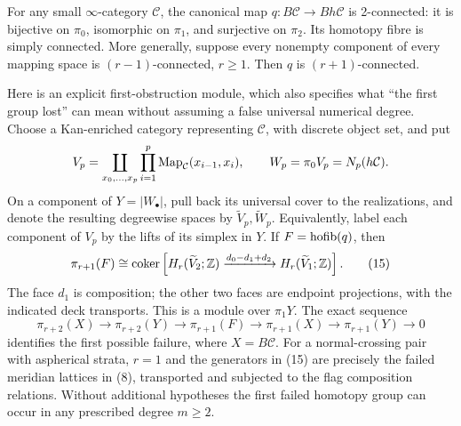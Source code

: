 \begin{theorem}\label{P1d3}
For any small $\infty$-category $\mathcal C$, the canonical map
$q:B\mathcal C\to B h\mathcal C$ is 2-connected: it is bijective
on $\pi_0$, isomorphic on $\pi_1$, and surjective on $\pi_2$.
Its homotopy fibre is simply connected.  More generally, suppose
every nonempty component of every mapping space is $(r-1)$-connected,
$r\geq1$.  Then $q$ is $(r+1)$-connected.

Here is an explicit first-obstruction module, which also specifies
what ``the first group lost'' can mean without assuming a false
universal numerical degree.  Choose a Kan-enriched category
representing $\mathcal C$, with discrete object set, and put
\[
 V_p=\coprod_{x_0,\ldots,x_p}\prod_{i=1}^p
         \operatorname{Map}_{\mathcal C}(x_{i-1},x_i),\qquad
 W_p=\pi_0V_p=N_p(h\mathcal C).
\]
On a component of $Y=|W_\bullet|$, pull back its universal cover
to the realizations, and denote the resulting degreewise spaces
by $\widetilde V_p,\widetilde W_p$.  Equivalently, label each
component of $V_p$ by the lifts of its simplex in $Y$.
If $F=\operatorname{hofib}(q)$, then
\[
 \pi_{r+1}(F)\cong
 \operatorname{coker}\left[
 H_r(\widetilde V_2;\mathbb Z)
 \xrightarrow{d_0-d_1+d_2}
 H_r(\widetilde V_1;\mathbb Z)\right].                            \tag{15}
\]
The face $d_1$ is composition; the other two faces are endpoint
projections, with the indicated deck transports.  This is a module
over $\pi_1Y$.  The exact sequence
\[
 \pi_{r+2}(X)\to\pi_{r+2}(Y)\to\pi_{r+1}(F)
 \to\pi_{r+1}(X)\to\pi_{r+1}(Y)\to0                      \tag{16}
\]
identifies the first possible failure, where $X=B\mathcal C$.
For a normal-crossing pair with aspherical strata, $r=1$ and the
generators in (15) are precisely the failed meridian lattices in
(8), transported and subjected to the flag composition relations.
Without additional hypotheses the first failed homotopy group
can occur in any prescribed degree $m\geq2$.
\end{theorem}
